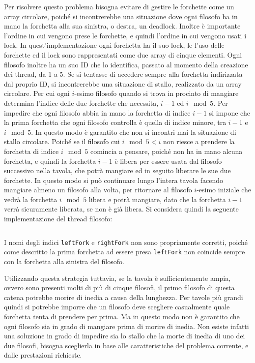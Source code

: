 \documentclass{article}
\numberwithin{equation}{subsection}
\begin{document}
Per risolvere questo problema bisogna evitare di gestire le forchette come un array circolare, poiché si incontrerebbe una situazione dove ogni filosofo ha in mano la forchetta alla sua sinistra, o destra, un deadlock. 
Inoltre è importante l'ordine in cui vengono prese le forchette, e quindi l'ordine in cui vengono usati i lock. In quest'implementazione ogni forchetta ha il suo lock, le l'uso delle forchette ed il lock sono rappresentati come due array di cinque elementi. 
Ogni filosofo inoltre ha un suo ID che lo identifica, passato al momento della creazione dei thread, da 1 a 5. Se si tentasse di accedere sempre alla forchetta indirizzata dal proprio ID, si incontrerebbe una situazione di stallo, realizzato da un array circolare. 
Per cui ogni $i$-esimo filosofo quando si trova in procinto di mangiare determina l'indice delle due forchette che necessita, $i-1$ ed $i\mod5$. Per impedire che ogni filosofo abbia in mano la forchetta di indice $i-1$ si impone che la prima forchetta che ogni filosofo controlla è quella di indice minore, tra $i-1$ e $i\mod5$. 
In questo modo è garantito che non si incontri mai la situazione di stallo circolare. Poiché se il filosofo cui $i\mod 5<i$ non riesce a prendere la forchetta di indice $i\mod 5$ comincia a pensare, poiché non ha in mano alcuna forchetta, e quindi la forchetta $i-1$ è libera per essere usata dal filosofo successivo nella tavola, che potrà mangiare ed in seguito liberare le sue due forchette. In questo modo si può continuare lungo l'intera tavola facendo mangiare almeno un filosofo alla volta, per ritornare al filosofo $i$-esimo iniziale che vedrà la forchetta $i\mod5$ libera e potrà mangiare, dato che la forchetta $i-1$ verrà sicuramente liberata, se non è già libera. 
Si considera quindi la seguente implementazione del thread filosofo:
\inputminted[firstline=55, lastline=114, breaklines, breakanywhere, autogobble]{c}{./Programmazione Concorrente/filosofi_a_cena.c}

I nomi degli indici \verb|leftFork| e \verb|rightFork| non sono propriamente corretti, poiché come descritto la prima forchetta ad essere presa \verb|leftFork| non coincide sempre con la forchetta alla sinistra del filosofo. 

Utilizzando questa strategia tuttavia, se la tavola è sufficientemente ampia, ovvero sono presenti molti di più di cinque filosofi, il primo filosofo di questa catena potrebbe morire di inedia a causa della lunghezza. Per tavole più grandi quindi si potrebbe imporre che un filosofo deve scegliere casualmente quale forchetta tenta di prendere per prima. Ma in questo modo non è garantito che ogni filosofo sia in grado di mangiare prima di morire di inedia. Non esiste infatti una soluzione in grado di impedire sia lo stallo che la morte di inedia di uno dei due filosofi, bisogna sceglierla in base alle caratteristiche del problema corrente, e dalle prestazioni richieste. 
\end{document}
